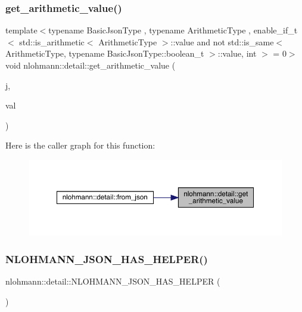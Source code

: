 \mbox{\label{namespacenlohmann_1_1detail_a85955b9c6dd31846e4b8e891f78614b6}} 
\subsubsection{\texorpdfstring{get\_arithmetic\_value()}{get\_arithmetic\_value()}}
{\footnotesize\ttfamily template$<$typename Basic\+Json\+Type , typename Arithmetic\+Type , enable\+\_\+if\+\_\+t$<$ std\+::is\+\_\+arithmetic$<$ Arithmetic\+Type $>$\+::value and not std\+::is\+\_\+same$<$ Arithmetic\+Type, typename Basic\+Json\+Type\+::boolean\+\_\+t $>$\+::value, int $>$  = 0$>$ \\
void nlohmann\+::detail\+::get\+\_\+arithmetic\+\_\+value (\begin{DoxyParamCaption}\item[{const Basic\+Json\+Type \&}]{j,  }\item[{Arithmetic\+Type \&}]{val }\end{DoxyParamCaption})}

Here is the caller graph for this function\+:
\nopagebreak
\begin{figure}[H]
\begin{center}
\leavevmode
\includegraphics[width=350pt]{namespacenlohmann_1_1detail_a85955b9c6dd31846e4b8e891f78614b6_icgraph}
\end{center}
\end{figure}
\mbox{\label{namespacenlohmann_1_1detail_a7b2601c238073c43a07862768b319cf8}} 
\subsubsection{\texorpdfstring{NLOHMANN\_JSON\_HAS\_HELPER()}{NLOHMANN\_JSON\_HAS\_HELPER()}\hspace{0.1cm}{\footnotesize\ttfamily [1/4]}}
{\footnotesize\ttfamily nlohmann\+::detail\+::\+N\+L\+O\+H\+M\+A\+N\+N\+\_\+\+J\+S\+O\+N\+\_\+\+H\+A\+S\+\_\+\+H\+E\+L\+P\+ER (\begin{DoxyParamCaption}\item[{mapped\+\_\+type}]{ }\end{DoxyParamCaption})}

